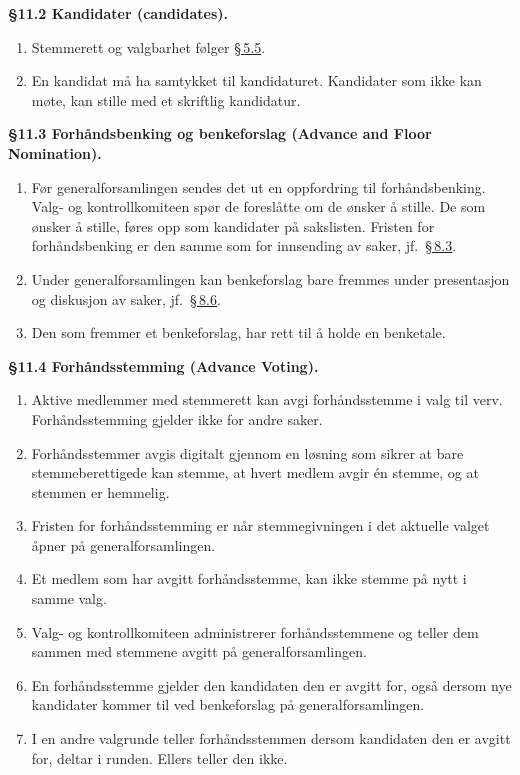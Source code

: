 \documentclass{../../../Common/Latex/Templates/rapport}
\begin{document}
\textbf{\S 11.2 Kandidater (candidates).}\label{nbylaw:11.2}
\begin{enumerate}
  \item Stemmerett og valgbarhet følger \hyperref[nbylaw:5.5]{\S\,5.5}.
  \item En kandidat m\r{a} ha samtykket til kandidaturet. Kandidater som ikke kan møte, kan stille med et skriftlig kandidatur.
\end{enumerate}

\textbf{\S 11.3 Forh\r{a}ndsbenking og benkeforslag (Advance and Floor Nomination).}\label{nbylaw:11.3}
\begin{enumerate}
  \item Før generalforsamlingen sendes det ut en oppfordring til forh\r{a}ndsbenking. Valg- og kontrollkomiteen spør de foresl\r{a}tte om de ønsker \r{a} stille. De som ønsker \r{a} stille, føres opp som kandidater p\r{a} sakslisten. Fristen for forh\r{a}ndsbenking er den samme som for innsending av saker, jf.\ \hyperref[nbylaw:8.3]{\S\,8.3}.
  \item Under generalforsamlingen kan benkeforslag bare fremmes under presentasjon og diskusjon av saker, jf.\ \hyperref[nbylaw:8.6]{\S\,8.6}.
  \item Den som fremmer et benkeforslag, har rett til \r{a} holde en benketale.
\end{enumerate}

\textbf{\S 11.4 Forh\r{a}ndsstemming (Advance Voting).}\label{nbylaw:11.4}
\begin{enumerate}
  \item Aktive medlemmer med stemmerett kan avgi forh\r{a}ndsstemme i valg til verv. Forh\r{a}ndsstemming gjelder ikke for andre saker.
  \item Forh\r{a}ndsstemmer avgis digitalt gjennom en løsning som sikrer at bare stemmeberettigede kan stemme, at hvert medlem avgir \'en stemme, og at stemmen er hemmelig.
  \item Fristen for forh\r{a}ndsstemming er n\r{a}r stemmegivningen i det aktuelle valget \r{a}pner p\r{a} generalforsamlingen.
  \item Et medlem som har avgitt forh\r{a}ndsstemme, kan ikke stemme p\r{a} nytt i samme valg.
  \item Valg- og kontrollkomiteen administrerer forh\r{a}ndsstemmene og teller dem sammen med stemmene avgitt p\r{a} generalforsamlingen.
  \item En forh\r{a}ndsstemme gjelder den kandidaten den er avgitt for, ogs\r{a} dersom nye kandidater kommer til ved benkeforslag p\r{a} generalforsamlingen.
  \item I en andre valgrunde teller forh\r{a}ndsstemmen dersom kandidaten den er avgitt for, deltar i runden. Ellers teller den ikke.
\end{enumerate}
\end{document}
